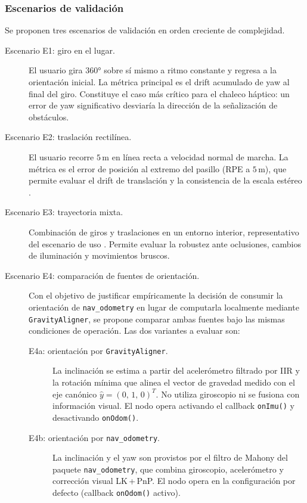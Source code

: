 \subsubsection{Escenarios de validación}

Se proponen tres escenarios de validación en orden creciente de complejidad.

\begin{description}
  \item[Escenario E1: giro en el lugar.] El usuario gira $360°$ sobre sí
    mismo a ritmo constante y regresa a la orientación inicial. La métrica
    principal es el drift acumulado de yaw al final del giro. Constituye el
    caso más crítico para el chaleco háptico: un error de yaw significativo
    desviaría la dirección de la señalización de obstáculos.

  \item[Escenario E2: traslación rectilínea.] El usuario recorre $5\,\text{m}$
    en línea recta a velocidad normal de marcha. La métrica es el error de
    posición al extremo del pasillo (RPE a $5\,\text{m}$), que permite evaluar
    el drift de translación y la consistencia de la escala estéreo
    \cite{Scharstein2002}.

  \item[Escenario E3: trayectoria mixta.] Combinación de giros y traslaciones
    en un entorno interior, representativo del escenario de uso
    \cite{Lee2016RGBD}. Permite evaluar la robustez ante oclusiones, cambios de
    iluminación y movimientos bruscos.

  \item[Escenario E4: comparación de fuentes de orientación.] Con el objetivo
    de justificar empíricamente la decisión de consumir la orientación de
    \texttt{nav\_odometry} en lugar de computarla localmente mediante
    \texttt{GravityAligner}, se propone comparar ambas fuentes bajo las mismas
    condiciones de operación. Las dos variantes a evaluar son:

    \begin{description}
      \item[E4a: orientación por \texttt{GravityAligner}.] La inclinación se
        estima a partir del acelerómetro filtrado por IIR y la rotación mínima
        que alinea el vector de gravedad medido con el eje canónico $\hat{y} =
        (0,\,1,\,0)^T$. No utiliza giroscopio ni se fusiona con información
        visual. El nodo opera activando el callback \texttt{onImu()} y
        desactivando \texttt{onOdom()}.
      \item[E4b: orientación por \texttt{nav\_odometry}.] La inclinación y el
        yaw son provistos por el filtro de Mahony del paquete
        \texttt{nav\_odometry}, que combina giroscopio, acelerómetro y
        corrección visual LK\,+\,PnP. El nodo opera en la configuración por
        defecto (callback \texttt{onOdom()} activo).
    \end{description}


\end{description}
